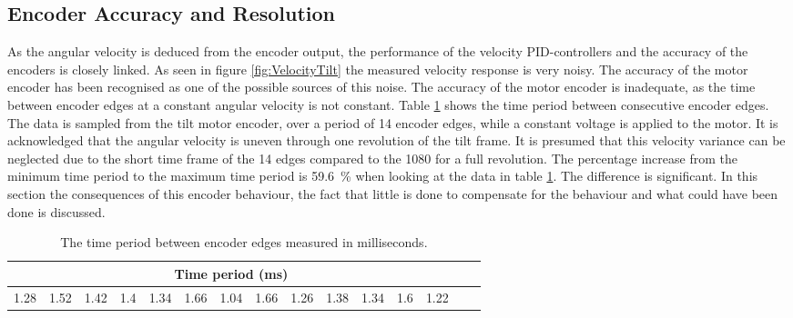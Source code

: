 \documentclass[../../main.tex]{subfiles}
\begin{document}
\subsection{Encoder Accuracy and Resolution}
As the angular velocity is deduced from the encoder output, the performance of the velocity PID-controllers and the accuracy of the encoders is closely linked. As seen in figure \ref{fig:VelocityTilt} the measured velocity response is very noisy. The accuracy of the motor encoder has been recognised as one of the possible sources of this noise. 
The accuracy of the motor encoder is inadequate, as the time between encoder edges at a constant angular velocity is not constant. Table \ref{tab:EncoderDifferenceBetweenEdges} shows the time period between consecutive encoder edges. The data is sampled from the tilt motor encoder, over a period of 14 encoder edges, while a constant voltage is applied to the motor. It is acknowledged that the angular velocity is uneven through one revolution of the tilt frame. It is presumed that this velocity variance can be neglected due to the short time frame of the 14 edges compared to the 1080 for a full revolution. 
The percentage increase from the minimum time period to the maximum time period is \SI{59.6}{\percent} when looking at the data in table \ref{tab:EncoderDifferenceBetweenEdges}.
The difference is significant. In this section the consequences of this encoder behaviour, the fact that little is done to compensate for the behaviour and what could have been done is discussed.

\begin{table}[H]
    \centering
    \begin{tabular}{c c c c c c c c c c c c c c c}
         \multicolumn{13}{c}{Time period (ms)} \\ \hline
         
         1.28 &
         1.52 &
         1.42 &
         1.4  &
         1.34 &
         1.66 &
         1.04 &
         1.66 &
         1.26 &
         1.38 &
         1.34 &
         1.6  &
         1.22 
       
    \end{tabular}
    \caption{The time period between encoder edges measured in milliseconds.}
    \label{tab:EncoderDifferenceBetweenEdges}
\end{table}
\end{document}
